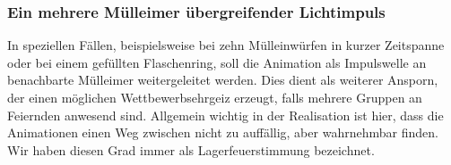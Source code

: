     \subsubsection{Ein mehrere Mülleimer übergreifender Lichtimpuls}

        In speziellen Fällen, beispielsweise bei zehn Mülleinwürfen in kurzer Zeitspanne oder bei einem gefüllten Flaschenring, soll die Animation als Impulswelle an benachbarte Mülleimer weitergeleitet werden.
        Dies dient als weiterer Ansporn, der einen möglichen Wettbewerbsehrgeiz erzeugt, falls mehrere Gruppen an Feiernden anwesend sind.
        Allgemein wichtig in der Realisation ist hier, dass die Animationen einen Weg zwischen nicht zu auffällig, aber wahrnehmbar finden.
        Wir haben diesen Grad immer als Lagerfeuerstimmung bezeichnet.
